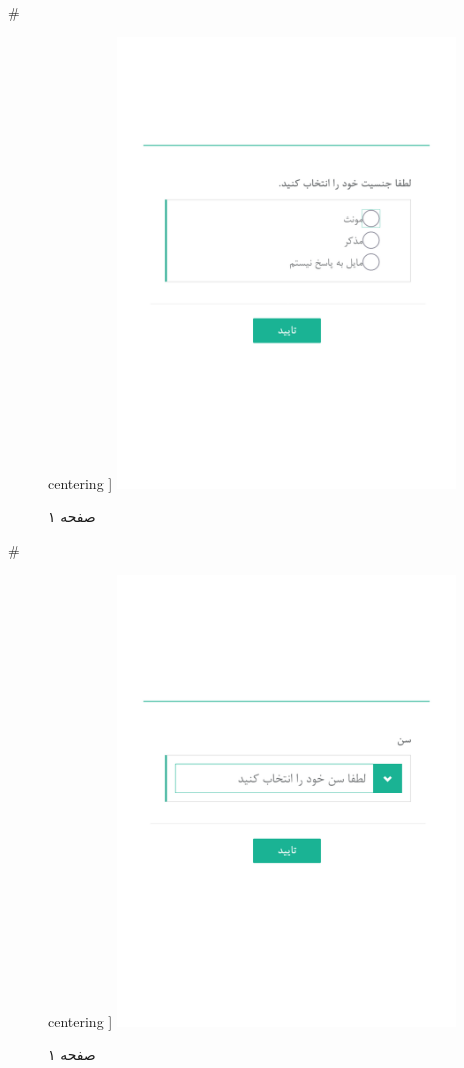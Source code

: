 { 
 # 
\begin{figure}[htpb]
centering ]
\includegraphics[width=0.8\textwidth]{./img/Task7.png/}
\caption{صفحه ۱}
\label{fig:Task1}
\end{figure}
 
 
 # 
\begin{figure}[htpb]
centering ]
\includegraphics[width=0.8\textwidth]{./img/Task8.png/}
\caption{صفحه ۱}
\label{fig:Task1}
\end{figure}
 
}
